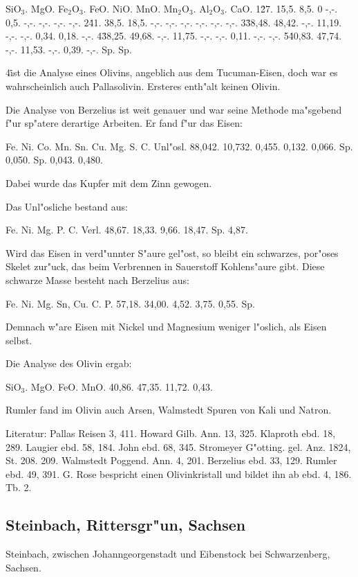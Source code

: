 \documentclass[a4paper, 11pt, oneside]{article}
\begin{document}
SiO$_{3}$. MgO. Fe$_{2}$O$_{3}$. FeO. NiO. MnO. Mn$_{2}$O$_{3}$. Al$_{2}$O$_{3}$. CaO.  
1\. 27. 15,5. 8,5. 0 -,-. 0,5. -,-. -,-. -,-. -,-.  
2\. 41. 38,5. 18,5. -,-. -,-. -,-. -,-. -,-. -,-.  
3\. 38,48. 48,42. -,-. 11,19. -,-. -,-. 0,34. 0,18. -,-.  
4\. 38,25. 49,68. -,-. 11,75. -,-. -,-. 0,11. -,-. -,-.  
5\. 40,83. 47,74. -,-. 11,53. -,-. 0,39. -,-. Sp. Sp.  

4\. ist die Analyse eines Olivins, angeblich aus dem Tucuman-Eisen, doch war es wahrscheinlich auch Pallasolivin. Ersteres enth"alt keinen Olivin.

Die Analyse von Berzelius ist weit genauer und war seine Methode ma"sgebend f"ur sp"atere derartige Arbeiten. Er fand f"ur das Eisen:

Fe. Ni. Co. Mn. Sn. Cu. Mg. S. C. Unl"osl.  
88,042. 10,732. 0,455. 0,132. 0,066. Sp. 0,050. Sp. 0,043. 0,480.

Dabei wurde das Kupfer mit dem Zinn gewogen.

Das Unl"osliche bestand aus:

Fe. Ni. Mg. P. C. Verl.  
48,67. 18,33. 9,66. 18,47. Sp. 4,87.

Wird das Eisen in verd"unnter S"aure gel"ost, so bleibt ein schwarzes, por"oses Skelet zur"uck, das beim Verbrennen in Sauerstoff Kohlens"aure gibt. Diese schwarze Masse besteht nach Berzelius aus:

Fe. Ni. Mg. Sn, Cu. C. P.
57,18. 34,00. 4,52. 3,75. 0,55. Sp.

Demnach w"are Eisen mit Nickel und Magnesium weniger l"oslich, als Eisen selbst.

Die Analyse des Olivin ergab:

SiO$_{3}$. MgO. FeO. MnO.  
40,86. 47,35. 11,72. 0,43.

Rumler fand im Olivin auch Arsen, Walmstedt Spuren von Kali und Natron.

Literatur: Pallas Reisen 3, 411. Howard Gilb. Ann. 13, 325. Klaproth ebd. 18, 289. Laugier ebd. 58, 184. John ebd. 68, 345. Stromeyer G"otting. gel. Anz. 1824, St. 208. 209. Walmstedt Poggend. Ann. 4, 201. Berzelius ebd. 33, 129. Rumler ebd. 49, 391. G. Rose bespricht einen Olivinkristall und bildet ihn ab ebd. 4, 186. Tb. 2.

\subsection{Steinbach, Rittersgr"un, Sachsen}

Steinbach, zwischen Johanngeorgenstadt und Eibenstock bei Schwarzenberg, Sachsen.
\end{document}
